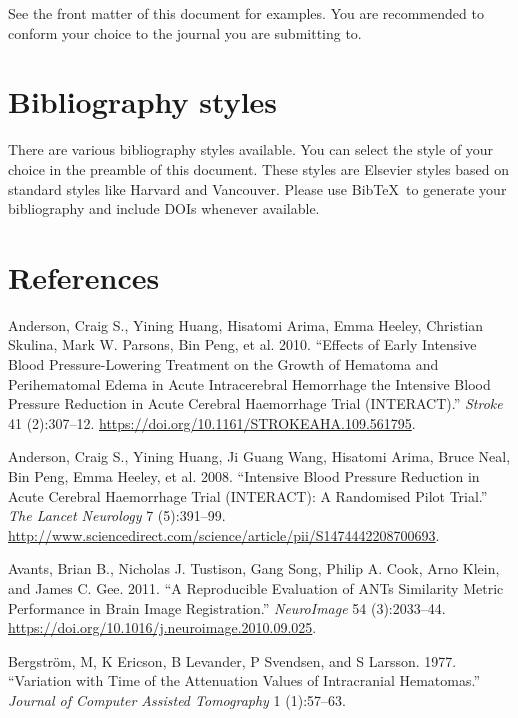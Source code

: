 \documentclass[]{elsarticle} %
\begin{document}
See the front matter of this document for examples. You are recommended
to conform your choice to the journal you are submitting to.

\hypertarget{bibliography-styles}{%
\section{Bibliography styles}\label{bibliography-styles}}

There are various bibliography styles available. You can select the
style of your choice in the preamble of this document. These styles are
Elsevier styles based on standard styles like Harvard and Vancouver.
Please use BibTeX~to generate your bibliography and include DOIs
whenever available.

\hypertarget{references}{%
\section*{References}\label{references}}

\hypertarget{refs}{}
\leavevmode\hypertarget{ref-anderson_effects_2010}{}%
Anderson, Craig S., Yining Huang, Hisatomi Arima, Emma Heeley, Christian
Skulina, Mark W. Parsons, Bin Peng, et al. 2010. ``Effects of Early
Intensive Blood Pressure-Lowering Treatment on the Growth of Hematoma
and Perihematomal Edema in Acute Intracerebral Hemorrhage the Intensive
Blood Pressure Reduction in Acute Cerebral Haemorrhage Trial
(INTERACT).'' \emph{Stroke} 41 (2):307--12.
\url{https://doi.org/10.1161/STROKEAHA.109.561795}.

\leavevmode\hypertarget{ref-anderson_intensive_2008}{}%
Anderson, Craig S., Yining Huang, Ji Guang Wang, Hisatomi Arima, Bruce
Neal, Bin Peng, Emma Heeley, et al. 2008. ``Intensive Blood Pressure
Reduction in Acute Cerebral Haemorrhage Trial (INTERACT): A Randomised
Pilot Trial.'' \emph{The Lancet Neurology} 7 (5):391--99.
\url{http://www.sciencedirect.com/science/article/pii/S1474442208700693}.

\leavevmode\hypertarget{ref-avants_reproducible_2011}{}%
Avants, Brian B., Nicholas J. Tustison, Gang Song, Philip A. Cook, Arno
Klein, and James C. Gee. 2011. ``A Reproducible Evaluation of ANTs
Similarity Metric Performance in Brain Image Registration.''
\emph{NeuroImage} 54 (3):2033--44.
\url{https://doi.org/10.1016/j.neuroimage.2010.09.025}.

\leavevmode\hypertarget{ref-bergstrom_variation_1977}{}%
Bergström, M, K Ericson, B Levander, P Svendsen, and S Larsson. 1977.
``Variation with Time of the Attenuation Values of Intracranial
Hematomas.'' \emph{Journal of Computer Assisted Tomography} 1
(1):57--63.
\end{document}
